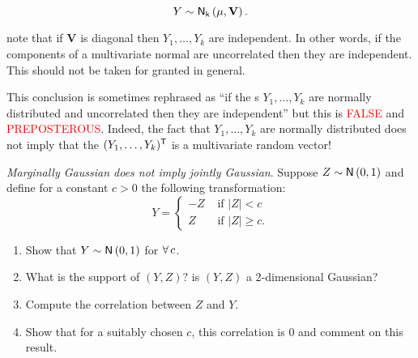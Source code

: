 \begin{revise}
	\begin{equation*}
		Y\sim\mathsf{N}_{\mathsf{k}}\left(\mu,\mathbf{V}\right).
	\end{equation*}
	\begin{remark}
		note that if $\mathbf{V}$ is diagonal then $Y_{1},\ldots,Y_{k}$ are independent. In other words, if the components of a multivariate normal are uncorrelated then they are independent. This should not be taken for granted in general.
	\end{remark}
	This conclusion is sometimes rephrased as ``if the \rv s $Y_{1},\ldots,Y_{k}$ are normally distributed and uncorrelated then they are independent'' but this is \textcolor{red}{FALSE} and \textcolor{red}{PREPOSTEROUS}. Indeed, the fact that $Y_{1},\ldots,Y_{k}$ are normally distributed does not imply that the \rv{} $(Y_{1},\ldots,Y_{k})^{\mathsf{T}}$ is a multivariate random vector! 
\end{revise}
\begin{exercise}
	\emph{Marginally Gaussian does not imply jointly Gaussian}. Suppose $Z\sim\mathsf{N}\left(0,1\right)$ and define for a constant $c>0$ the following transformation:\begin{equation*}
	Y=\begin{cases}
		-Z&\text{ if }|Z|<c\\
		Z&\text{ if }|Z|\geq c.
	\end{cases}
	\end{equation*}
	\begin{enumerate}
		\item Show that $Y\sim\mathsf{N}\left(0,1\right)$ for $\forall\, c$.
		\item What is the support of $(Y,Z)?$ is $(Y,Z)$ a 2-dimensional Gaussian?
		\item Compute the correlation between $Z$ and $Y$.
		\item Show that for a suitably chosen $c$, this correlation is 0 and comment on this result.
	\end{enumerate}
\end{exercise}
